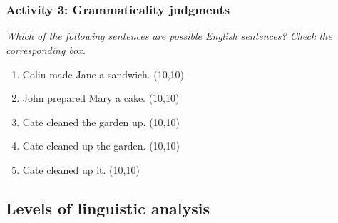 \documentclass[11pt, oneside]{article}   	%
\begin{document}
 \\

\vspace{1.5cm}

 \\

\vspace{1cm}

\subsubsection{Activity 3: Grammaticality judgments}

{\itshape Which of the following sentences are possible English sentences? Check the corresponding box.}

\parbox{.5\textwidth}{%
   \begin{enumerate}
    \item Colin made Jane a sandwich. \hfill \framebox(10,10){}
    \item John prepared Mary a cake. \hfill \framebox(10,10){}
    \item Cate cleaned the garden up. \hfill \framebox(10,10){}
    \item Cate cleaned up the garden. \hfill \framebox(10,10){}
    \item Cate cleaned up it. \hfill \framebox(10,10){}
    \end{enumerate}%
}

\subsection{Levels of linguistic analysis}
\end{document}
